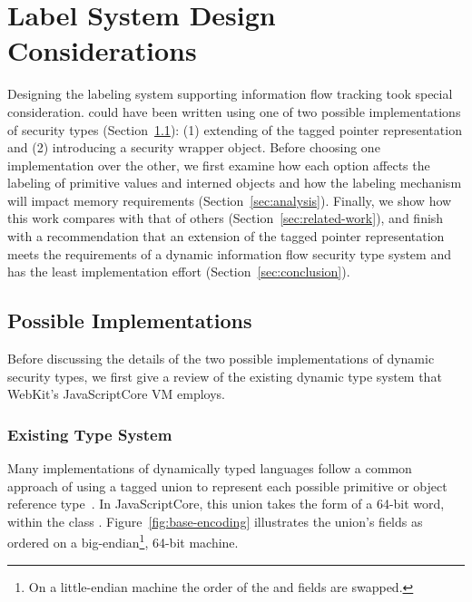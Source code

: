 
\chapter{Label System Design Considerations}
\label{ch:system-design}

Designing the labeling system supporting information flow tracking took special consideration.
\FlowCore could have been written using one of two possible implementations of security types (Section~\ref{sec:implementation}): (1) extending of the tagged pointer representation and (2) introducing a security wrapper object.
Before choosing one implementation over the other, we first examine how each option affects the labeling of primitive values and interned objects and how the labeling mechanism will impact memory requirements (Section~\ref{sec:analysis}).
Finally, we show how this work compares with that of others (Section~\ref{sec:related-work}), and finish with a recommendation that an extension of the tagged pointer representation meets the requirements of a dynamic information flow security type system and has the least implementation effort (Section~\ref{sec:conclusion}).

\section{Possible Implementations}
\label{sec:implementation}

Before discussing the details of the two possible implementations of dynamic security types, we first give a review of the existing dynamic type system that WebKit's JavaScriptCore VM employs.

\subsection{Existing Type System}

Many implementations of dynamically typed languages follow a common approach of using a tagged union to represent each possible primitive or object reference type~\cite{gudeman+93}.
In JavaScriptCore, this union takes the form of a 64-bit word, within the class .
Figure~\ref{fig:base-encoding} illustrates the union's fields as ordered on a big-endian\footnote{On a little-endian machine the order of the  and  fields are swapped.}, 64-bit machine.

